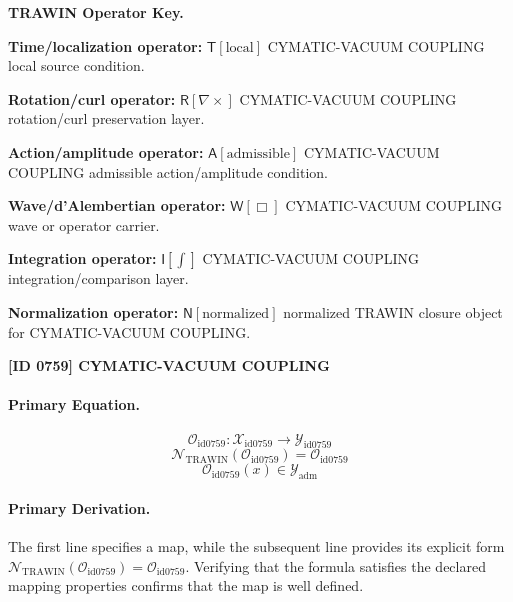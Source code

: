 \par\vspace{0.45\baselineskip}
\noindent\begin{minipage}[t]{\linewidth}
\begingroup
\small
\raggedright
\textbf{TRAWIN Operator Key.}\par
\noindent\textbf{Time/localization operator:} $\mathsf{T}\!\left[\mathrm{local}\right]$ CYMATIC-VACUUM COUPLING local source condition.\par
\noindent\textbf{Rotation/curl operator:} $\mathsf{R}\!\left[\nabla\times\right]$ CYMATIC-VACUUM COUPLING rotation/curl preservation layer.\par
\noindent\textbf{Action/amplitude operator:} $\mathsf{A}\!\left[\mathrm{admissible}\right]$ CYMATIC-VACUUM COUPLING admissible action/amplitude condition.\par
\noindent\textbf{Wave/d'Alembertian operator:} $\mathsf{W}\!\left[\Box\right]$ CYMATIC-VACUUM COUPLING wave or operator carrier.\par
\noindent\textbf{Integration operator:} $\mathsf{I}\!\left[\int\right]$ CYMATIC-VACUUM COUPLING integration/comparison layer.\par
\noindent\textbf{Normalization operator:} $\mathsf{N}\!\left[\mathrm{normalized}\right]$ normalized TRAWIN closure object for CYMATIC-VACUUM COUPLING.\par
\endgroup
\end{minipage}

\clearpage
\noindent\textbf{[ID 0759] CYMATIC-VACUUM COUPLING}\par
\vspace{0.35em}
\paragraph{Primary Equation.}
\[
\mathcal{O}_{\mathrm{id0759}}:\mathcal{X}_{\mathrm{id0759}}\longrightarrow\mathcal{Y}_{\mathrm{id0759}}
\]
\[
\mathcal{N}_{\mathrm{TRAWIN}}(\mathcal{O}_{\mathrm{id0759}})=\mathcal{O}_{\mathrm{id0759}}
\]
\[
\mathcal{O}_{\mathrm{id0759}}(x)\in\mathcal{Y}_{\mathrm{adm}}
\]

\paragraph{Primary Derivation.}
The first line specifies a map, while the subsequent line provides its explicit form \( \mathcal{N}_{\mathrm{TRAWIN}}(\mathcal{O}_{\mathrm{id0759}})=\mathcal{O}_{\mathrm{id0759}} \). Verifying that the formula satisfies the declared mapping properties confirms that the map is well defined.
